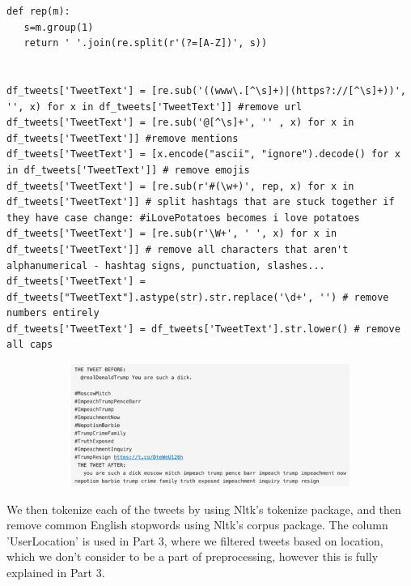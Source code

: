 \begin{listing*}[t]
\begin{verbatim}
def rep(m):
   s=m.group(1)
   return ' '.join(re.split(r'(?=[A-Z])', s))


df_tweets['TweetText'] = [re.sub('((www\.[^\s]+)|(https?://[^\s]+))', '', x) for x in df_tweets['TweetText']] #remove url
df_tweets['TweetText'] = [re.sub('@[^\s]+', '' , x) for x in df_tweets['TweetText']] #remove mentions
df_tweets['TweetText'] = [x.encode("ascii", "ignore").decode() for x in df_tweets['TweetText']] # remove emojis
df_tweets['TweetText'] = [re.sub(r'#(\w+)', rep, x) for x in df_tweets['TweetText']] # split hashtags that are stuck together if they have case change: #iLovePotatoes becomes i love potatoes
df_tweets['TweetText'] = [re.sub(r'\W+', ' ', x) for x in df_tweets['TweetText']] # remove all characters that aren't alphanumerical - hashtag signs, punctuation, slashes...
df_tweets['TweetText'] = df_tweets["TweetText"].astype(str).str.replace('\d+', '') # remove numbers entirely
df_tweets['TweetText'] = df_tweets['TweetText'].str.lower() # remove all caps
\end{verbatim}
\caption{}
\label{listing:p1-code1}
\end{listing*}

\begin{figure}
    \centering
    \begin{subfigure}{0.5\columnwidth}
        \includegraphics[width=1\textwidth]{images/prepr1.png}
    \end{subfigure}
    \caption{}
    \label{fig:prepr}
\end{figure}


We then tokenize each of the tweets by using Nltk's tokenize package, and then remove common English stopwords using Nltk's corpus package.
The column 'UserLocation' is used in Part 3, where we filtered tweets based on location, which we don't consider to be a part of preprocessing, however this is fully explained in Part 3. 

